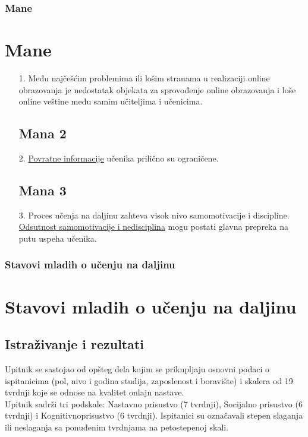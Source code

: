 \documentclass[11pt]{beamer}
\begin{document}
\begin{frame}
		\frametitle{Mane}
		\section{Mane}
		
		\begin{itemize}
	\subsection{Mana 1}\item[1.]{Među najčešćim problemima ili lošim stranama u realizaciji online obrazovanja je nedostatak objekata za sprovođenje online obrazovanja i
    loše online veštine među samim učiteljima i učenicima. }

	\subsection{Mana 2}
		
	\item[2.]{ \underline{Povratne informacije} učenika prilično su ograničene.}
 \subsection {Mana 3}\item[3.] {Proces učenja na daljinu zahteva visok nivo samomotivacije i discipline. \underline{Odsutnost samomotivacije i nedisciplina} mogu postati glavna prepreka
na putu uspeha učenika. }
		\end{itemize}
	
\end{frame}





\begin{frame}
		\frametitle{Stavovi mladih o učenju na daljinu}
		\section{Stavovi mladih o učenju na daljinu}
		\subsection{Istraživanje i rezultati}
		Upitnik se sastojao od opšteg dela kojim se prikupljaju osnovni podaci o ispitanicima (pol, nivo i godina studija, zaposlenost i boravište) i skalera od 19 tvrdnji koje se odnose na kvalitet onlajn nastave.\\ Upitnik sadrži tri podskale: Nastavno prisustvo (7 tvrdnji), Socijalno prisustvo (6 tvrdnji) i Kognitivnoprisustvo (6 tvrdnji). Ispitanici su označavali stepen slaganja ili neslaganja sa ponuđenim tvrdnjama na petostepenoj skali.
\end{frame}
\end{document}
